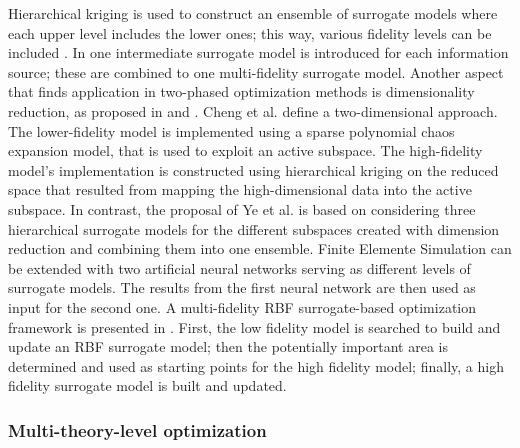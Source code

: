 \documentclass[preprint,12pt]{elsarticle}
\begin{document}
Hierarchical kriging is used to construct an ensemble of surrogate models where each upper level includes the lower ones; this way, various fidelity levels can be included \cite{han2012hierarchical}. In \cite{lam2015multifidelity} one intermediate surrogate model is introduced for each information source; these are combined to one multi-fidelity surrogate model.
Another aspect that finds application in two-phased optimization methods is dimensionality reduction, as proposed in \cite{cheng2020hierarchical} and \cite{ye2018ensemble}.
Cheng et al. \cite{cheng2020hierarchical} define a two-dimensional approach. The lower-fidelity model is implemented using a sparse polynomial chaos expansion model, that is used to exploit an active subspace. The high-fidelity model's implementation is constructed using hierarchical kriging on the reduced space that resulted from mapping the high-dimensional data into the active subspace.
In contrast, the proposal of Ye et al. \cite{ye2018ensemble} is based on considering three hierarchical surrogate models for the different subspaces created with dimension reduction and combining them into one ensemble. Finite Elemente Simulation can be extended with two artificial neural networks serving as different levels of surrogate models. The results from the first neural network are then used as input for the second one. A multi-fidelity RBF surrogate-based optimization framework is presented in \cite{yi2020multi}. First, the low fidelity model is searched to build and update an RBF surrogate model; then the potentially important area is determined and used as starting points for the high fidelity model; finally, a high fidelity surrogate model is built and updated.


\subsubsection{Multi-theory-level optimization}
\end{document}
